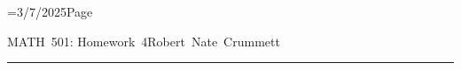 \footline={3/7/2025\hfill Page \folio}
\def\reals{I\kern-4pt R}
\def\nats{I\kern-4pt N}
\let\oldexists\exists \def\exists{\oldexists \;}
\let\oldforall\forall \def\forall{\oldforall \,}
\def\qed{\vrule height 6pt width 6pt depth 0pt}
\parindent 0pt
\parskip 2mm


MATH~501: Homework~4\hfill Robert~Nate~Crummett
\smallskip
\hrule


\bye
